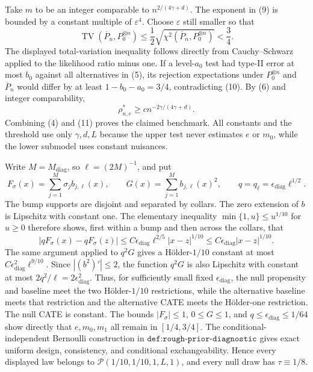 Take \(m\) to be an integer comparable to \(n^{2/(4\gamma+d)}\). The exponent in (9) is bounded by a constant multiple of \(\varepsilon^4\). Choose \(\varepsilon\) still smaller so that
\[
 \operatorname{TV}(\overline P_n,P_0^{\otimes n})
 \le\frac12\sqrt{\chi^2(\overline P_n,P_0^{\otimes n})}<\frac34.    \tag{10}
\]
The displayed total-variation inequality follows directly from Cauchy--Schwarz applied to the likelihood ratio minus one. If a level-\(a_0\) test had type-II error at most \(b_0\) against all alternatives in (5), its rejection expectations under \(P_0^{\otimes n}\) and \(\overline P_n\) would differ by at least \(1-b_0-a_0=3/4\), contradicting (10). By (6) and integer comparability,
\[
 \rho_{n,e}^*\ge c n^{-2\gamma/(4\gamma+d)}.                          \tag{11}
\]
Combining (4) and (11) proves the claimed benchmark. All constants and the threshold use only \(\gamma,d,L\) because the upper test never estimates \(e\) or \(m_0\), while the lower submodel uses constant nuisances.

Write \(M=M_{\mathrm{diag}}\), so \(\ell=(2M)^{-1}\), and put
\[
 F_\sigma(x)=\sum_{j=1}^M\sigma_jb_{j,\ell}(x),
 \qquad
 G(x)=\sum_{j=1}^M b_{j,\ell}(x)^2,
 \qquad
 q=q_\ell=\epsilon_{\mathrm{diag}}\ell^{1/2}.
\]
The bump supports are disjoint and separated by collars. The zero extension of \(b\) is Lipschitz with constant one. The elementary inequality \(\min\{1,u\}\le u^{1/10}\) for \(u\ge0\) therefore shows, first within a bump and then across the collars, that
\[
 |qF_\sigma(x)-qF_\sigma(z)|
 \le C\epsilon_{\mathrm{diag}}\ell^{2/5}|x-z|^{1/10}
 \le C\epsilon_{\mathrm{diag}}|x-z|^{1/10}.                          \tag{12}
\]
The same argument applied to \(q^2G\) gives a Hölder-\(1/10\) constant at most \(C\epsilon_{\mathrm{diag}}^2\ell^{9/10}\). Since \(|(b^2)'|\le2\), the function \(q^2G\) is also Lipschitz with constant at most \(2q^2/\ell=2\epsilon_{\mathrm{diag}}^2\). Thus, for sufficiently small fixed \(\epsilon_{\mathrm{diag}}\), the null propensity and baseline meet the two Hölder-\(1/10\) restrictions, while the alternative baseline meets that restriction and the alternative CATE meets the Hölder-one restriction. The null CATE is constant. The bounds \(|F_\sigma|\le1\), \(0\le G\le1\), and \(q\le\epsilon_{\mathrm{diag}}\le1/64\) show directly that \(e,m_0,m_1\) all remain in \([1/4,3/4]\). The conditional-independent Bernoulli construction in \(\texttt{def:rough-prior-diagnostic}\) gives exact uniform design, consistency, and conditional exchangeability. Hence every displayed law belongs to \(\mathcal P(1/10,1/10,1,L,1)\), and every null draw has \(\tau\equiv1/8\).

